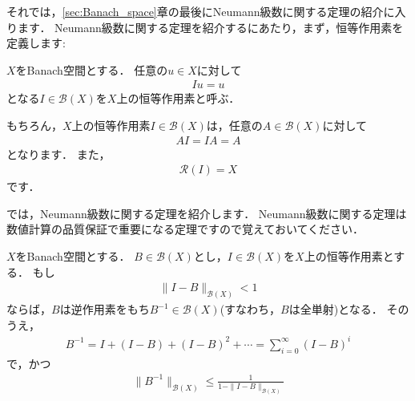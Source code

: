 それでは，\ref{sec:Banach_space}章の最後にNeumann級数に関する定理の紹介に入ります．
Neumann級数に関する定理を紹介するにあたり，まず，恒等作用素を定義します:

\begin{defi}[$X$上の恒等作用素]\label{def:identity_operator_on_X}
$X$をBanach空間とする．
任意の$u \in X$に対して
\begin{align*}
 I u = u
\end{align*}
となる$I \in {\mathcal B}(X)$を$X$上の恒等作用素と呼ぶ．
\end{defi}

もちろん，$X$上の恒等作用素$I \in {\mathcal B}(X)$は，任意の$A \in {\mathcal B}(X)$に対して
\begin{align*}
 A I  = I A = A
\end{align*}
となります．
また，
\begin{align*}
 {\mathcal R}(I) = X
\end{align*}
です．

では，Neumann級数に関する定理を紹介します．
Neumann級数に関する定理は数値計算の品質保証で重要になる定理ですので覚えておいてください．

\begin{Thm}[Neumann級数]\label{thm:nuemann_ser}
$X$をBanach空間とする．
$B \in {\mathcal B}(X)$とし，$I \in {\mathcal B}(X)$を$X$上の恒等作用素とする．
もし
\begin{align*}
 \| I - B \|_{{\mathcal B}(X)} < 1
\end{align*}
ならば，$B$は逆作用素をもち$B^{-1} \in {\mathcal B}(X)$(すなわち，$B$は全単射)となる．
そのうえ，
\begin{align*}
  B^{-1} = I + (I - B) + (I - B)^2 + \cdots = \sum_{i = 0}^\infty (I - B)^i
\end{align*}
で，かつ
\begin{align*}
  \| B^{-1} \|_{{\mathcal B}(X)} \le \frac{ 1 }{ 1 - \| I - B \|_{{\mathcal B}(X)} }
\end{align*}

\end{Thm}

